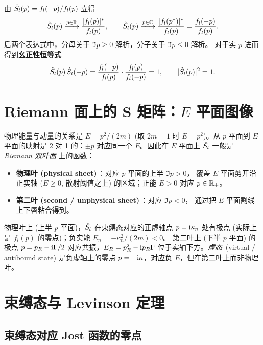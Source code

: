 由 $\hat{S}_l(p)=f_l(-p)/f_l(p)$ 立得
\begin{equation}
\hat{S}_l(p)\xrightarrow{p\in\mathbb{R}}\frac{[f_l(p)]^*}{f_l(p)},\qquad
\hat{S}_l(p)\xrightarrow{p\in\mathbb{C}}\frac{[f_l(p^*)]^*}{f_l(p)}=\frac{f_l(-p)}{f_l(p)}.
\label{eq:Sl-from-fl}
\end{equation}
后两个表达式中，分母关于 $\Im p\geq 0$ 解析，分子关于 $\Im p\leq 0$ 解析。
对于实 $p$ 进而得到\textbf{幺正性恒等式}
\begin{equation}
\hat{S}_l(p)\,\hat{S}_l(-p)=\frac{f_l(-p)}{f_l(p)}\cdot\frac{f_l(p)}{f_l(-p)}=1,\qquad
|\hat{S}_l(p)|^2 = 1.
\label{eq:unitarity}
\end{equation}

\section{Riemann 面上的 S 矩阵：$E$ 平面图像}\label{sec:riemann}

物理能量与动量的关系是 $E=p^2/(2m)$ (取 $2m=1$ 时 $E=p^2$)。从 $p$ 平面到
$E$ 平面的映射是 2 对 1 的：$\pm p$ 对应同一个 $E$。因此在 $E$ 平面上
$\hat{S}_l$ 一般是 \emph{Riemann 双叶面} 上的函数：

\begin{itemize}
\item \textbf{物理叶 (physical sheet)}\,：对应 $p$ 平面的上半 $\Im p>0$，
覆盖 $E$ 平面剪开沿正实轴 ($E\geq 0$, 散射阈值之上) 的区域；正能 $E>0$
对应 $p\in\mathbb{R}_+$。
\item \textbf{第二叶 (second / unphysical sheet)}\,：对应 $\Im p<0$，
通过把 $E$ 平面割线上下唇粘合得到。
\end{itemize}

物理叶上 (上半 $p$ 平面)，$\hat{S}_l$ 在束缚态对应的正虚轴点
$p=\mathrm{i}\kappa_n$ 处有极点 (实际上是 $f_l(p)$ 的零点)；负实能 $E_n=-\kappa_n^2/(2m)<0$。
第二叶上 (下半 $p$ 平面) 的极点 $p=p_R-\mathrm{i}\Gamma/2$ 对应共振，$E_R=p_R^2-\mathrm{i} p_R\Gamma$
位于实轴下方。\emph{虚态}\, (virtual / antibound state) 是负虚轴上的零点
$p=-\mathrm{i}\kappa$，对应负 $E$，但在第二叶上而非物理叶。

\section{束缚态与 Levinson 定理}\label{sec:bound-states}

\subsection{束缚态对应 Jost 函数的零点}\label{ssec:bound-zeros}

